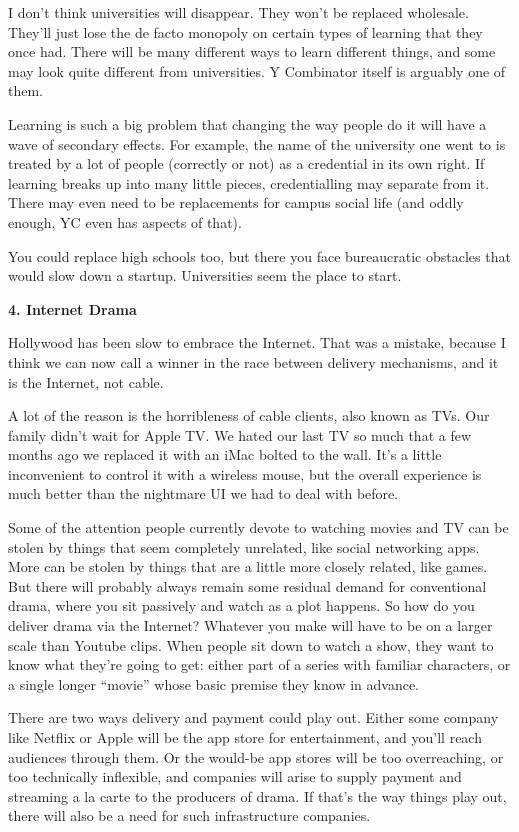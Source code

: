 I don't think universities will disappear. They won't be replaced
wholesale. They'll just lose the de facto monopoly on certain types of
learning that they once had. There will be many different ways to learn
different things, and some may look quite different from universities. Y
Combinator itself is arguably one of them.

Learning is such a big problem that changing the way people do it will
have a wave of secondary effects. For example, the name of the
university one went to is treated by a lot of people (correctly or not)
as a credential in its own right. If learning breaks up into many little
pieces, credentialling may separate from it. There may even need to be
replacements for campus social life (and oddly enough, YC even has
aspects of that).

You could replace high schools too, but there you face bureaucratic
obstacles that would slow down a startup. Universities seem the place to
start.

\textbf{4. Internet Drama}

Hollywood has been slow to embrace the Internet. That was a mistake,
because I think we can now call a winner in the race between delivery
mechanisms, and it is the Internet, not cable.

A lot of the reason is the horribleness of cable clients, also known as
TVs. Our family didn't wait for Apple TV. We hated our last TV so much
that a few months ago we replaced it with an iMac bolted to the wall.
It's a little inconvenient to control it with a wireless mouse, but the
overall experience is much better than the nightmare UI we had to deal
with before.

Some of the attention people currently devote to watching movies and TV
can be stolen by things that seem completely unrelated, like social
networking apps. More can be stolen by things that are a little more
closely related, like games. But there will probably always remain some
residual demand for conventional drama, where you sit passively and
watch as a plot happens. So how do you deliver drama via the Internet?
Whatever you make will have to be on a larger scale than Youtube clips.
When people sit down to watch a show, they want to know what they're
going to get: either part of a series with familiar characters, or a
single longer ``movie'' whose basic premise they know in advance.

There are two ways delivery and payment could play out. Either some
company like Netflix or Apple will be the app store for entertainment,
and you'll reach audiences through them. Or the would-be app stores will
be too overreaching, or too technically inflexible, and companies will
arise to supply payment and streaming a la carte to the producers of
drama. If that's the way things play out, there will also be a need for
such infrastructure companies.

